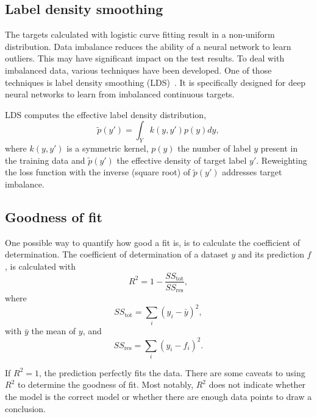 
\subsection{Label density smoothing}
The targets calculated with logistic curve fitting result in a non-uniform distribution.
Data imbalance reduces the ability of a neural network to learn outliers.
This may have significant impact on the test results.
To deal with imbalanced data, various techniques have been developed.
One of those techniques is label density smoothing (LDS)~.
It is specifically designed for deep neural networks to learn from imbalanced continuous targets.

\newcommand{\edtl}{$\tilde{p}(y')$ }
LDS computes the effective label density distribution,
\begin{equation}
    \tilde{p}(y') = \int_Y k(y, y')p(y)dy,
\end{equation}
where $k(y,y')$ is a symmetric kernel, $p(y)$ the number of label $y$ present in the training data and \edtl the effective density of target label $y'$.
Reweighting the loss function with the inverse (square root) of \edtl addresses target imbalance.

\subsection{Goodness of fit}\label{subsec:coef_det}

One possible way to quantify how good a fit is, is to calculate the coefficient of determination.
The coefficient of determination of a dataset $y$ and its prediction $f$, is calculated with
\begin{equation}
    R^2 = 1 - \frac{SS_\mathrm{tot}}{SS_\mathrm{res}},
\end{equation}
where
\begin{equation}
    SS_\mathrm{tot} = \sum_i (y_i - \bar{y})^2,
\end{equation}
with $\bar{y}$ the mean of $y$, and
\begin{equation}
    SS_\mathrm{res} = \sum_i (y_i - f_i)^2.
\end{equation}

If $R^2 = 1$, the prediction perfectly fits the data.
There are some caveats to using $R^2$ to determine the goodness of fit.
Most notably, $R^2$ does not indicate whether the model is the correct model or whether there are enough data points to draw a conclusion.
